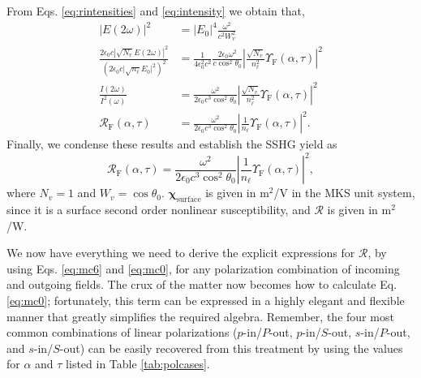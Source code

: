 \documentclass[aps,pra,10pt,amsmath,twocolumn,letterpaper]{revtex4-1}
\begin{document}
From Eqs. \eqref{eq:rintensities} and \eqref{eq:intensity} we obtain that,
\begin{equation*}\label{eq:r01m}
\begin{split}
\vert E(2\omega)\vert^{2} &=
\vert E_{0}\vert^{4}\frac{\omega^{2}}{c^{2}W^{2}_{v}}\\
\frac{2\epsilon_{0}c|\sqrt{N_{v}}E(2\omega)|^{2}}
     {\left(2\epsilon_{0}c\vert\sqrt{n_{\ell}}E_{0}\vert^{2}\right)^{2}}
&=
\frac{1}{4\epsilon^{2}_0c^{2}}
\frac{2\epsilon_{0}\omega^{2}}{c\cos^{2}\theta_{0}}
\left\vert\frac{\sqrt{N_{v}}}{n^{2}_{\ell}}
\Upsilon_{\mathrm{F}}(\alpha,\tau)\right\vert^{2}\\
\frac{I(2\omega)}{I^{2}(\omega)} &=
\frac{\omega^{2}}{2\epsilon_{0}c^3\cos^{2}\theta_{0}}
\left\vert\frac{\sqrt{N_{v}}}{n^{2}_{\ell}}
\Upsilon_{\mathrm{F}}(\alpha,\tau)\right\vert^{2}\\
\mathcal{R}_{\mathrm{F}}(\alpha,\tau) &=
\frac{\omega^{2}}{2\epsilon_{0}c^3\cos^{2}\theta_{0}}
\left\vert  \frac{1}{n_{\ell}}\Upsilon_{\mathrm{F}}(\alpha,\tau)\right\vert^{2}.
\end{split}
\end{equation*}
Finally, we condense these results and establish the SSHG yield as
\begin{equation}\label{eq:mc6}
\mathcal{R}_{\mathrm{F}}(\alpha,\tau)=
\frac{\omega^{2}}{2\epsilon_{0}c^3\cos^{2}\theta_{0}}
\left\vert\frac{1}{n_{\ell}}\Upsilon_{\mathrm{F}}(\alpha,\tau)\right\vert^{2} 
,
\end{equation}
where $N_{v}=1$ and $W_{v}=\cos\theta_{0}$.
$\boldsymbol{\chi}_{\mathrm{surface}}$ is given in m$^{2}$/V in the MKS unit
system, since it is a surface second order nonlinear susceptibility, and
$\mathcal{R}$ is given in m$^2$/W. 

We now have everything we need to derive the explicit expressions for
$\mathcal{R}$, by using Eqs. \eqref{eq:mc6} and \eqref{eq:mc0}, for any
polarization combination of incoming and outgoing fields. The crux of the matter
now becomes how to calculate Eq. \eqref{eq:mc0}; fortunately, this term can be
expressed in a highly elegant and flexible manner that greatly simplifies the
required algebra. Remember, the four most common combinations of linear
polarizations ($p$-in/$P$-out, $p$-in/$S$-out, $s$-in/$P$-out, and
$s$-in/$S$-out) can be easily recovered from this treatment by using the values
for $\alpha$ and $\tau$ listed in Table \ref{tab:polcases}.
\end{document}
